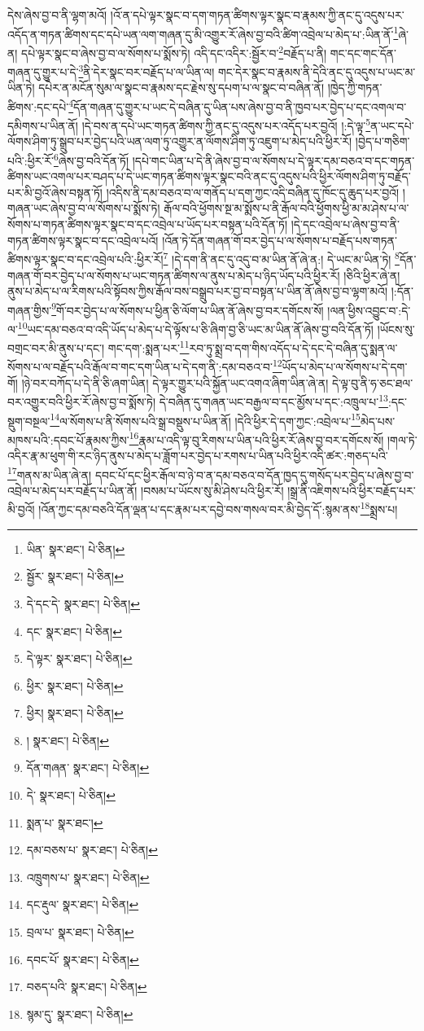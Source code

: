 དེས་ཞེས་བྱ་བ་ནི་ལྷག་མའོ། །འོ་ན་དཔེ་ལྟར་སྣང་བ་དག་གཏན་ཚིགས་ལྟར་སྣང་བ་རྣམས་ཀྱི་ནང་དུ་འདུས་པར་འདོད་ན་གཏན་ཚིགས་དང་དཔེ་ཡན་ལག་གཞན་དུ་མི་འགྱུར་རོ་ཞེས་བྱ་བའི་ཚིག་འབྲེལ་པ་མེད་པ་:ཡིན་ནོ་\footnote{ཡིན་  སྣར་ཐང་།  པེ་ཅིན། }ཞེ་ན། དཔེ་ལྟར་སྣང་བ་ཞེས་བྱ་བ་ལ་སོགས་པ་སྨོས་ཏེ། འདི་དང་འདིར་:སྦྱོར་བ་\footnote{སྦྱོར་  སྣར་ཐང་།  པེ་ཅིན། }བརྗོད་པ་ནི། གང་དང་གང་དོན་གཞན་དུ་གྱུར་པ་དེ་\footnote{དེ་དང་དེ་  སྣར་ཐང་།  པེ་ཅིན། }ནི་དེར་སྣང་བར་བརྗོད་པ་ལ་ཡིན་ལ། གང་དེར་སྣང་བ་རྣམས་ནི་དེའི་ནང་དུ་འདུས་པ་ཡང་མ་ཡིན་ཏེ། དཔེར་ན་མངོན་སུམ་ལ་སྣང་བ་རྣམས་དང་རྗེས་སུ་དཔག་པ་ལ་སྣང་བ་བཞིན་ནོ། །ཁྱེད་ཀྱི་གཏན་ཚིགས་:དང་དཔེ་\footnote{དང་  སྣར་ཐང་།  པེ་ཅིན། }དོན་གཞན་དུ་གྱུར་པ་ཡང་དེ་བཞིན་དུ་ཡིན་པས་ཞེས་བྱ་བ་ནི་ཁྱབ་པར་བྱེད་པ་དང་འགལ་བ་དམིགས་པ་ཡིན་ནོ། །དེ་བས་ན་དཔེ་ཡང་གཏན་ཚིགས་ཀྱི་ནང་དུ་འདུས་པར་འདོད་པར་བྱའོ། །:དེ་ལྟ་\footnote{དེ་ལྟར་  སྣར་ཐང་།  པེ་ཅིན། }ན་ཡང་དཔེ་ལོགས་ཤིག་ཏུ་སྒྲུབ་པར་བྱེད་པའི་ཡན་ལག་ཏུ་འགྱུར་ན་ལོགས་ཤིག་ཏུ་འཇུག་པ་མེད་པའི་ཕྱིར་རོ། །བྱེད་པ་གཅིག་པའི་:ཕྱིར་རོ་\footnote{ཕྱིར་  སྣར་ཐང་།  པེ་ཅིན། }ཞེས་བྱ་བའི་དོན་ཏོ། །དཔེ་གང་ཡིན་པ་དེ་ནི་ཞེས་བྱ་བ་ལ་སོགས་པ་དེ་ལྟར་དམ་བཅའ་བ་དང་གཏན་ཚིགས་ཡང་འགལ་པར་བཤད་པ་དེ་ཡང་གཏན་ཚིགས་ལྟར་སྣང་བའི་ནང་དུ་འདུས་པའི་ཕྱིར་ལོགས་ཤིག་ཏུ་བརྗོད་པར་མི་བྱའོ་ཞེས་བསྟན་ཏོ། །འདིས་ནི་དམ་བཅའ་བ་ལ་གནོད་པ་དག་ཀྱང་འདི་བཞིན་དུ་ཁོང་དུ་ཆུད་པར་བྱའོ། །གཞན་ཡང་ཞེས་བྱ་བ་ལ་སོགས་པ་སྨོས་ཏེ། རྒོལ་བའི་ཕྱོགས་སྔ་མ་སྨོས་པ་ནི་རྒོལ་བའི་ཕྱོགས་ཕྱི་མ་མ་ཤེས་པ་ལ་སོགས་པ་གཏན་ཚིགས་ལྟར་སྣང་བ་དང་འབྲེལ་པ་ཡོད་པར་བསྟན་པའི་དོན་ཏོ། །དེ་དང་འབྲེལ་པ་ཞེས་བྱ་བ་ནི་གཏན་ཚིགས་ལྟར་སྣང་བ་དང་འབྲེལ་པའོ། །འོན་ཏེ་དོན་གཞན་གོ་བར་བྱེད་པ་ལ་སོགས་པ་བརྗོད་པས་གཏན་ཚིགས་ལྟར་སྣང་བ་དང་འབྲེལ་པའི་:ཕྱིར་རོ།\footnote{ཕྱིར།  སྣར་ཐང་།  པེ་ཅིན། } །དེ་དག་ནི་ནང་དུ་འདུ་བ་མ་ཡིན་ནོ་ཞེ་ན:། དེ་ཡང་མ་ཡིན་ཏེ། \footnote{།    སྣར་ཐང་།  པེ་ཅིན། }དོན་གཞན་གོ་བར་བྱེད་པ་ལ་སོགས་པ་ཡང་གཏན་ཚིགས་ལ་ནུས་པ་མེད་པ་ཉིད་ཡོད་པའི་ཕྱིར་རོ། །ཅིའི་ཕྱིར་ཞེ་ན། ནུས་པ་མེད་པ་ལ་རིགས་པའི་སྟོབས་ཀྱིས་རྒོལ་བས་བསྒྲུབ་པར་བྱ་བ་བསྟན་པ་ཡིན་ནོ་ཞེས་བྱ་བ་ལྷག་མའོ། །:དོན་གཞན་གྱིས་\footnote{དོན་གཞན་  སྣར་ཐང་།  པེ་ཅིན། }གོ་བར་བྱེད་པ་ལ་སོགས་པ་ཕྱིན་ཅི་ལོག་པ་ཡིན་ནོ་ཞེས་བྱ་བར་དགོངས་སོ། །ལན་ཕྱིས་འབྱུང་བ་:དེ་ལ་\footnote{དེ་  སྣར་ཐང་།  པེ་ཅིན། }ཡང་དམ་བཅའ་བ་འདི་ཡོད་པ་མེད་པ་དེ་ལྟོས་པ་ཅི་ཞིག་བྱ་ཅི་ཡང་མ་ཡིན་ནོ་ཞེས་བྱ་བའི་དོན་ཏོ། །ཡོངས་སུ་བགྲང་བར་མི་ནུས་པ་དང་། གང་དག་:སྨན་པར་\footnote{སྨན་པ་  སྣར་ཐང་། }རབ་ཏུ་སྨྲ་བ་དག་གིས་འདོད་པ་དེ་དང་དེ་བཞིན་དུ་སྨན་ལ་སོགས་པ་ལ་བརྗོད་པའི་རྒོལ་བ་གང་དག་ཡིན་པ་དེ་དག་ནི་:དམ་བཅའ་བ་\footnote{དམ་བཅས་པ་  སྣར་ཐང་།  པེ་ཅིན། }ཡོད་པ་མེད་པ་ལ་སོགས་པ་དེ་དག་གོ། །ཉེ་བར་བཀོད་པ་དེ་ནི་ཅི་ཞག་ཡིན། དེ་ལྟར་གྱུར་པའི་སྐྱོན་ཡང་འགའ་ཞིག་ཡིན་ཞེ་ན། དེ་ལྟ་བུ་ནི་ཧ་ཅང་ཐལ་བར་འགྱུར་བའི་ཕྱིར་རོ་ཞེས་བྱ་བ་སྨོས་ཏེ། དེ་བཞིན་དུ་གཞན་ཡང་བརྒྱལ་བ་དང་མྱོས་པ་དང་:འཁྲུལ་པ་\footnote{འཁྲུགས་པ་  སྣར་ཐང་།  པེ་ཅིན། }:དང་སྡུག་བསྔལ་\footnote{དང་རྡུལ་  སྣར་ཐང་།  པེ་ཅིན། }ལ་སོགས་པ་ནི་སོགས་པའི་སྒྲ་བསྡུས་པ་ཡིན་ནོ། །དེའི་ཕྱིར་དེ་དག་ཀྱང་:འབྲེལ་པ་\footnote{བྲལ་པ་  སྣར་ཐང་།  པེ་ཅིན། }མེད་པས་མཁས་པའི་:དབང་པོ་རྣམས་ཀྱིས་\footnote{དབང་པོ་  སྣར་ཐང་།  པེ་ཅིན། }རྣམ་པ་འདི་ལྟ་བུ་རིགས་པ་ཡིན་པའི་ཕྱིར་རོ་ཞེས་བྱ་བར་དགོངས་སོ། །གལ་ཏེ་འདིར་རྣ་མ་ཕུག་གི་རང་ཉིད་ནུས་པ་མེད་པ་ཟློག་པར་བྱེད་པ་རགས་པ་ཡིན་པའི་ཕྱིར་འདི་ཚར་:གཅད་པའི་\footnote{བཅད་པའི་  སྣར་ཐང་།  པེ་ཅིན། }གནས་མ་ཡིན་ཞེ་ན། དབང་པོ་དང་ཕྱིར་རྒོལ་བ་ཉེ་བ་ན་དམ་བཅའ་བ་དོན་ཁྱད་དུ་གསོད་པར་བྱེད་པ་ཞེས་བྱ་བ་འབྲེལ་པ་མེད་པར་བརྗོད་པ་ཡིན་ནོ། །བསམ་པ་ཡོངས་སུ་མི་ཤེས་པའི་ཕྱིར་རོ། །སྒྲ་ནི་འཇིགས་པའི་ཕྱིར་བརྗོད་པར་མི་བྱའོ། །འོན་ཀྱང་དམ་བཅའི་དོན་ལྡན་པ་དང་རྣམ་པར་དབྱེ་བས་གསལ་བར་མི་བྱེད་དོ་:སྙམ་ནས་\footnote{སྙམ་དུ་  སྣར་ཐང་།  པེ་ཅིན། }སྨྲས་པ། 